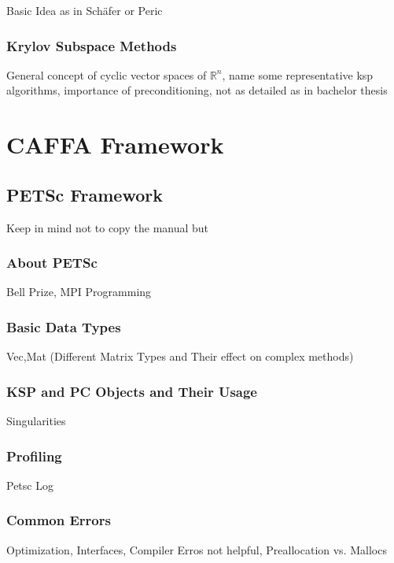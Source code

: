 \documentclass[article,type=msc,colorback,accentcolor=tud2a]{tudthesis}
\begin{document}
          Basic Idea as in Schäfer or Peric

        \subsubsection{Krylov Subspace Methods}

          General concept of cyclic vector spaces of \(\mathbb{R}^n\), name some representative ksp algorithms, importance of preconditioning, not as detailed as in bachelor thesis

  \section{CAFFA Framework}

    \subsection{PETSc Framework}
        Keep in mind not to copy the manual but
      \subsubsection{About PETSc}

        Bell Prize, MPI Programming

      \subsubsection{Basic Data Types}

        Vec,Mat (Different Matrix Types and Their effect on complex methods)

      \subsubsection{KSP and PC Objects and Their Usage}

        Singularities

      \subsubsection{Profiling}

        Petsc Log 

      \subsubsection{Common Errors}

        Optimization, Interfaces, Compiler Erros not helpful, Preallocation vs. Mallocs
\end{document}
